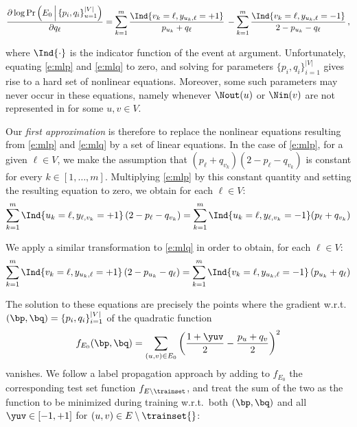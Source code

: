 \begin{equation}\label{e:mlq}
\frac{\partial \log \Pr\left(E_0 \,\Big|\, \{p_i, q_i\}_{u=1}^{|V|}\right)}{\partial q_{\ell}}
= \sum_{k=1}^m
\frac{\Ind{v_k = \ell,y_{u_k,\ell}=+1}}{p_{u_k}+q_{\ell}}\,
- \sum_{k=1}^m
\frac{\Ind{v_k = \ell,y_{u_k,\ell}=-1}}{2-p_{u_k}-q_{\ell}}\,,
\end{equation}

where $\Ind{\cdot}$ is the indicator function of the event at argument.
Unfortunately, equating \eqref{e:mlp} and \eqref{e:mlq} to zero, and solving for parameters
$\{p_i, q_i\}_{i=1}^{|V|}$ gives rise to a hard set of nonlinear equations.
Moreover, some such parameters may never occur in these equations, namely whenever $\Nout(u)$ or
$\Nin(v)$ are not represented in \trainset{} for some $u,v\in V$.

Our \emph{first approximation} is therefore to replace the nonlinear equations resulting
from \eqref{e:mlp} and \eqref{e:mlq} by a set of linear equations. In the case of \eqref{e:mlp}, for
a given $\ell \in V$, we make the assumption that $(p_{\ell}+q_{v_k}) (2-p_{\ell}-q_{v_k})$ is
constant for every $k \in [1,\ldots,m]$. Multiplying \eqref{e:mlp} by this constant
quantity and setting the resulting equation to zero, we obtain for each $\ell \in V$:
\begin{equation*}
  \sum_{k=1}^m \Ind{u_k = \ell,y_{\ell,v_k}=+1} \left(2-p_{\ell}-q_{v_k}\right)
  = \sum_{k=1}^m \Ind{u_k = \ell,y_{\ell,v_k}=-1}
  (p_{\ell}+q_{v_k})
\end{equation*}

We apply a similar transformation to \eqref{e:mlq} in order to obtain, for each $\ell \in V$:
\begin{equation*}
  \sum_{k=1}^m \Ind{v_k = \ell,y_{u_k,\ell}=+1} \left(2-p_{u_k}-q_{\ell}\right)
  = \sum_{k=1}^m  \Ind{v_k = \ell,y_{u_k,\ell}=-1}
  \left(p_{u_k}+q_{\ell}\right)
\end{equation*}

The solution to these equations are precisely the points where the gradient w.r.t.\ $(\bp,\bq)
=\{p_i, q_i\}_{i=1}^{|V|}$ of the quadratic function
\[
f_{E_0}(\bp,\bq) = \sum_{(u,v) \in E_0} \left(\frac{1+\yuv}{2} - \frac{p_u+q_v}{2} \right)^2
\]
vanishes.
We follow a label propagation approach by adding to $f_{E_0}$ the corresponding test set function
$f_{E\setminus \trainset}$, and treat the sum of the two as the function to be minimized during
training w.r.t.\ both $(\bp,\bq)$ and all $\yuv \in [-1,+1]$ for $(u,v)\in E\setminus \trainset{}$:

